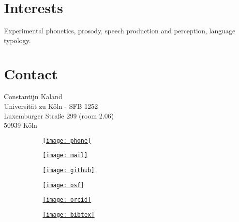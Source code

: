 \documentclass[a4paper,11pt]{article}
\begin{document}
\section*{Interests}
Experimental phonetics, prosody, speech production and perception, language typology.\\

\section*{Contact}
Constantijn Kaland\\
Universit{\"a}t zu K{\"o}ln - SFB 1252\\
Luxemburger Stra{\ss}e 299 (room 2.06)\\
50939 K{\"o}ln\\

\begin{figure}[ht]
\centering
\begin{subfigure}{.18\textwidth}
\href{tel:+4922147089909}{\texttt{[image: phone]}}
\end{subfigure}
\begin{subfigure}{.15\textwidth}
\href{mailto:c.c.l.kaland@outlook.com}{\texttt{[image: mail]}}
\end{subfigure}
\begin{subfigure}{.11\textwidth}
\href{http://constantijnkaland.github.io/}{\texttt{[image: github]}}
\end{subfigure}
\begin{subfigure}{.12\textwidth}
\href{http://osf.io/nhgba}{\texttt{[image: osf]}}
\end{subfigure}
\begin{subfigure}{.23\textwidth}
\href{http://orcid.org/0000-0002-1813-5902}{\texttt{[image: orcid]}}
\end{subfigure}
\begin{subfigure}{.15\textwidth}
\href{https://constantijnkaland.github.io/publications_CK.bib}{\texttt{[image: bibtex]}}
\end{subfigure}
\end{figure}

\newpage
\section*{}
\end{document}
